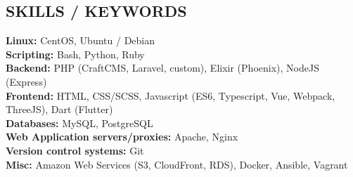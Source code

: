 \documentclass[margin,line]{resume}
\begin{document}
\begin{resume}
    \vspace{-1mm}

\sectionline

    \section{\mysidestyle \textbf{\large{S}\small{KILLS} / \large{K}\small{EYWORDS}}}

    \textbf{Linux:} CentOS, Ubuntu / Debian\\
    \textbf{Scripting:} Bash, Python, Ruby\\
    \textbf{Backend:} PHP (CraftCMS, Laravel, custom), Elixir (Phoenix), NodeJS (Express)\\
    \textbf{Frontend:} HTML, CSS/SCSS, Javascript (ES6, Typescript, Vue, Webpack, ThreeJS), Dart (Flutter)\\
    \textbf{Databases:} MySQL, PostgreSQL\\
    \textbf{Web Application servers/proxies:} Apache, Nginx\\
    \textbf{Version control systems:} Git\\
    \textbf{Misc:} Amazon Web Services (S3, CloudFront, RDS), Docker, Ansible, Vagrant



\end{resume}
\end{document}
